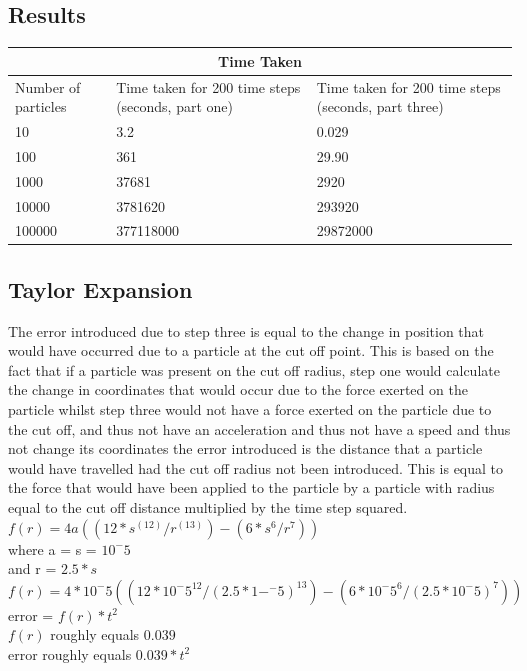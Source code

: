 \documentclass[paper=a4, fontsize=11pt]{scrartcl}
\numberwithin{equation}{section}		%
\numberwithin{figure}{section}			%
\numberwithin{table}{section}				%
\begin{document}
\subsection{Results}

\centering
\begin{tabular}{ |p{5cm}||p{5cm}|p{5cm}|}
 \hline
 \multicolumn{3}{|c|}{Time Taken} \\
 \hline
 Number of particles & Time taken for 200 time steps (seconds, part one) & Time taken for 200 time steps (seconds, part three)\\
 \hline
 10 & 3.2 & 0.029 \\
 100 & 361 & 29.90 \\
 1000 & 37681 & 2920 \\
 10000 & 3781620 & 293920 \\
 100000 & 377118000 & 29872000\\
 \hline
\end{tabular}

\subsection{Taylor Expansion}

The error introduced due to step three is equal to the change in position that would have occurred due to a particle at the cut off point. This is based on the fact that if a particle was present on the cut off radius, step one would calculate the change in coordinates that would occur due to the force exerted on the particle whilst step three would not have a force exerted on the particle due to the cut off, and thus not have an acceleration and thus not have a speed and thus not change its coordinates the error introduced is the distance that a particle would have travelled had the cut off radius not been introduced. This is equal to the force that would have been applied to the particle by a particle with radius equal to the cut off distance multiplied by the time step squared.\\
\center
$f(r) = 4a((12 * s^(12) / r^(13)) - (6 * s^6 / r^7))$\\
where a = s = $10^-5$\\
and r = $2.5 * s$\\
$f(r) = 4 * 10^-5((12 * 10^-5^12/(2.5 * 1-^-5)^13) - (6 * 10^-5^6 / (2.5 * 10^-5)^7))$\\
error = $f(r) * t^2$\\
$f(r)$ roughly equals $0.039$\\
error roughly equals $0.039 * t^2$\\


\end{document}
